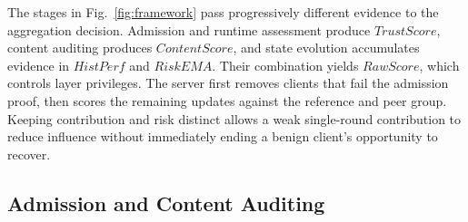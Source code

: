 \documentclass[conference,compsoc]{IEEEtran}
\begin{document}
The stages in Fig.~\ref{fig:framework} pass progressively different evidence to the aggregation decision. Admission and runtime assessment produce $TrustScore$, content auditing produces $ContentScore$, and state evolution accumulates evidence in $HistPerf$ and $RiskEMA$. Their combination yields $RawScore$, which controls layer privileges. The server first removes clients that fail the admission proof, then scores the remaining updates against the reference and peer group. Keeping contribution and risk distinct allows a weak single-round contribution to reduce influence without immediately ending a benign client's opportunity to recover.

\subsection{Admission and Content Auditing}
\end{document}
